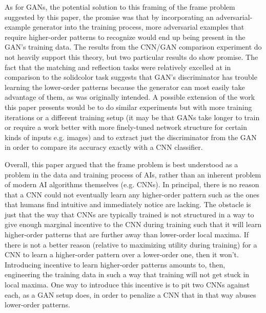 \documentclass{article}
\begin{document}
As for GANs, the potential solution to this framing of the frame problem suggested by this paper, the promise was that by incorporating an adversarial-example generator into the training process, more adversarial examples that require higher-order patterns to recognize would end up being present in the GAN's training data.
The results from the CNN/GAN comparison experiment do not heavily support this theory, but two particular results do show promise.
The fact that the matching and reflection tasks were relatively excelled at in comparison to the solidcolor task suggests that GAN's discriminator has trouble learning the lower-order patterns because the generator can most easily take advantage of them, as was originally intended.
A possible extension of the work this paper presents would be to do similar experiments but with more training iterations or a different training setup (it may be that GANs take longer to train or require a work better with more finely-tuned network structure for certain kinds of inputs e.g. images) and to extract just the discriminator from the GAN in order to compare its accuracy exactly with a CNN classifier.

Overall, this paper argued that the frame problem is best understood as a problem in the data and training process of AIs, rather than an inherent problem of modern AI algorithms themselves (e.g. CNNs).
In principal, there is no reason that a CNN could not eventually learn any higher-order pattern such as the ones that humans find intuitive and immediately notice are lacking.
The obstacle is just that the way that CNNs are typically trained is not structured in a way to give enough marginal incentive to the CNN during training such that it will learn higher-order patterns that are further away than lower-order local maxima.
If there is not a better reason (relative to maximizing utility during training) for a CNN to learn a higher-order pattern over a lower-order one, then it won't.
Introducing incentive to learn higher-order patterns amounts to, then, engineering the training data in such a way that training will not get stuck in local maxima.
One way to introduce this incentive is to pit two CNNs against each, as a GAN setup does, in order to penalize a CNN that in that way abuses lower-order patterns.
\end{document}
